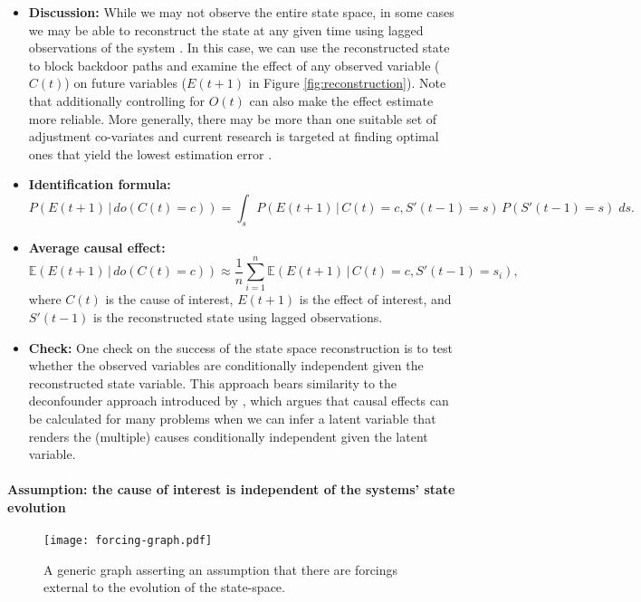 \documentclass[12pt]{article}
\begin{document}
\begin{itemize}
\item \textbf{Discussion:} While we may not observe the entire state
  space, in some cases we may be able to reconstruct the state at any
  given time using lagged observations of the system \citep[see
  Takens' theorem,][]{takens1981detecting}. In this case, we can use
  the reconstructed state to block backdoor paths and examine the
  effect of any observed variable ($C(t)$) on future variables
  ($E(t+1)$ in Figure \ref{fig:reconstruction}). Note that
  additionally controlling for $O(t)$ can also make the effect
  estimate more reliable. More generally, there may be more than one
  suitable set of adjustment co-variates and current research is
  targeted at finding optimal ones that yield the lowest estimation
  error \citep[e.g.,][]{witte2020efficient}.
\item \textbf{Identification formula:}
  \begin{equation*}
    P(E(t+1) \, | \, do(C(t) = c)) = \int_{s} P(E(t+1) \, | \, C(t) = c,
    S'(t-1) = s) \, P(S'(t-1)=s) \; d s.
  \end{equation*}
\item \textbf{Average causal effect:}
  \begin{equation*}
    \mathbb{E}(E(t+1) \, | \, do(C(t) = c)) \approx \frac{1}{n}
    \sum_{i=1}^n \mathbb{E}(E(t+1) \, | \, C(t)=c, S'(t-1)=s_i),
  \end{equation*}
  where $C(t)$ is the cause of interest, $E(t+1)$ is the effect of
  interest, and $S'(t-1)$ is the reconstructed state using lagged
  observations.
\item \textbf{Check:} One check on the success of the state space
  reconstruction is to test whether the observed variables are
  conditionally independent given the reconstructed state
  variable. This approach bears similarity to the deconfounder
  approach introduced by \cite{yixin-2019}, which argues that causal
  effects can be calculated for many problems when we can infer a
  latent variable that renders the (multiple) causes conditionally
  independent given the latent variable.
\end{itemize}


\paragraph{Assumption: the cause of interest is independent of the
  systems' state evolution}

\begin{figure} \texttt{[image: forcing-graph.pdf]}
  \centering
  \caption{A generic graph asserting an assumption that there are
    forcings external to the evolution of the state-space.}
  \label{fig:forcing}
\end{figure}
\end{document}
